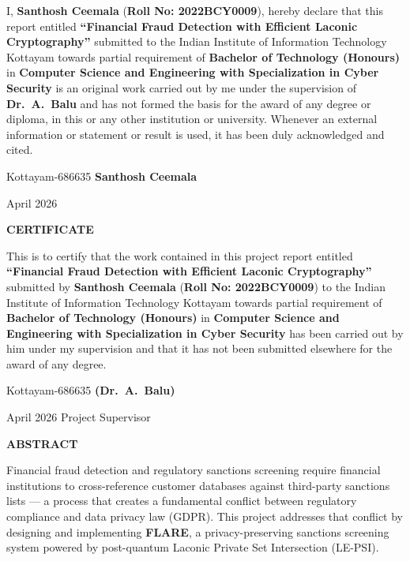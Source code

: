 \documentclass[12pt,a4paper]{report}
\theoremstyle{plain}
\theoremstyle{definition}
\theoremstyle{remark}
\begin{document}
\noindent I, \textbf{Santhosh Ceemala} (\textbf{Roll No: 2022BCY0009}), hereby declare that
this report entitled \textbf{``Financial Fraud Detection with Efficient Laconic Cryptography''}
submitted to the Indian Institute of Information Technology Kottayam towards partial
requirement of {\bf Bachelor of Technology (Honours)} in \textbf{Computer Science and
Engineering with Specialization in Cyber Security} is an original work carried out by me
under the supervision of \textbf{Dr.~A.~Balu} and has not formed the basis for the award
of any degree or diploma, in this or any other institution or university. Whenever an
external information or statement or result is used, it has been duly acknowledged and cited.

\vspace{4cm}

\noindent Kottayam-686635 \hfill \textbf{Santhosh Ceemala}

\noindent April 2026

\clearpage

\begin{center}
{\large{\bf{CERTIFICATE}}}
\end{center}

\noindent This is to certify that the work contained in this project report entitled
\textbf{``Financial Fraud Detection with Efficient Laconic Cryptography''} submitted by
\textbf{Santhosh Ceemala} (\textbf{Roll No: 2022BCY0009}) to the Indian Institute of
Information Technology Kottayam towards partial requirement of {\bf Bachelor of Technology
(Honours)} in \textbf{Computer Science and Engineering with Specialization in Cyber
Security} has been carried out by him under my supervision and that it has not been
submitted elsewhere for the award of any degree.

\vspace{4cm}

\noindent Kottayam-686635 \hfill \textbf{(Dr.~A.~Balu)}

\noindent April 2026 \hfill Project Supervisor

\clearpage

\begin{center}
{\Large{\bf{ABSTRACT}}}
\end{center}

Financial fraud detection and regulatory sanctions screening require financial institutions
to cross-reference customer databases against third-party sanctions lists --- a process
that creates a fundamental conflict between regulatory compliance and data privacy law
(GDPR). This project addresses that conflict by designing and implementing \textbf{FLARE},
a privacy-preserving sanctions screening system
powered by post-quantum Laconic Private Set Intersection (LE-PSI).
\end{document}
